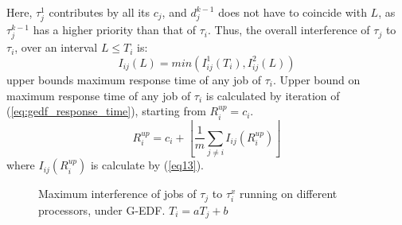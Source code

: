 %
Here, $\tau_{j}^{1}$ contributes by all its $c_j$, and $d_j^{k-1}$ does not have to coincide with $L$, as $\tau_j^{k-1}$ has a higher priority than that of $\tau_{i}$. 
%
Thus, the overall interference of $\tau_j$ to $\tau_i$, over an interval $L \le T_i$ is:
\begin{equation}
I_{ij}\left(L\right)=min\left(I^1_{ij}\left(T_{i}\right),I^2_{ij}\left(L\right)\right)\label{eq13}\end{equation}
%
\cite{key-2} upper bounds maximum response time of any job of $\tau_i$. Upper bound on maximum response time of any job of $\tau_i$ is calculated by iteration of (\ref{eq:gedf_response_time}), starting from $R_i^{up}=c_i$.
%
\begin{equation}
R_i^{up}=c_i + \left\lfloor\frac{1}{m}\sum_{j\neq i}I_{ij}\left(R_i^{up}\right)\right\rfloor
\label{eq:gedf_response_time}
\end{equation}
%
where $I_{ij}\left(R_i^{up}\right)$ is calculate by (\ref{eq13}).
\begin{figure}%
\centering
{}
%
%
\caption{Maximum interference of jobs of $\tau_j$ to $\tau_i^x$ running on different processors, under G-EDF. $T_i=aT_j+b$}
\label{fig:max_interference_gedf_j_i}
\end{figure}
%
